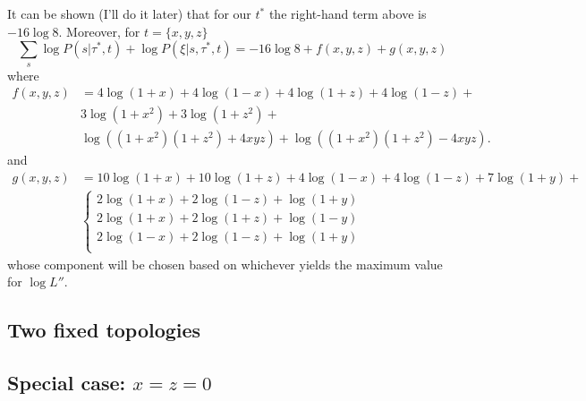 It can be shown (I'll do it later) that for our $t^*$ the right-hand term above is $-16\log 8$.
Moreover, for $t=\{x,y,z\}$
\begin{equation}
\sum_{s} \log P(s | \tau^*, t) + \log P(\xi | s, \tau^*, t) = -16\log 8 + f(x,y,z) + g(x,y,z)
\end{equation}
where
\begin{align}
f(x,y,z) &= 4\log(1+x)+4\log(1-x)+4\log(1+z)+4\log(1-z)+\\
& 3\log(1+x^2)+3\log(1+z^2)+\\
& \log((1+x^2)(1+z^2)+4xyz) + \log((1+x^2)(1+z^2)-4xyz).
\end{align}
and
\begin{align}
g(x,y,z) &= 10\log(1+x)+10\log(1+z)+4\log(1-x)+4\log(1-z)+7\log(1+y)+\\
& \left\{ 
  \begin{array}{l}
  2\log(1+x)+2\log(1-z)+\log(1+y)\\
  2\log(1+x)+2\log(1+z)+\log(1-y)\\
  2\log(1-x)+2\log(1-z)+\log(1+y)\\
  \end{array} \right.
\end{align}
whose component will be chosen based on whichever yields the maximum value for $\log L''$.

\subsection{Two fixed topologies}

\subsection{Special case: $x=z=0$}

